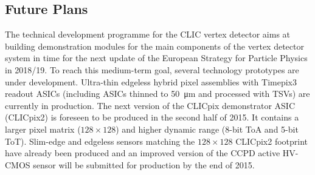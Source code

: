 \subsection{Future Plans}
The technical development programme for the CLIC vertex detector aims at building
demonstration modules for the main components of the vertex detector system
in time for the next update of the European Strategy
for Particle Physics in 2018/19. To reach this medium-term goal, several technology prototypes
are under development.
Ultra-thin edgeless hybrid pixel assemblies with Timepix3 readout ASICs (including ASICs thinned to \SI{50}{\micro\meter}
and processed with TSVs) are currently in production.
The next version of the CLICpix demonstrator
ASIC (CLICpix2) is foreseen to be produced in the second half of 2015. It contains a larger
pixel matrix ($128\times 128$) and higher dynamic range (8-bit ToA and 5-bit ToT).
Slim-edge and edgeless sensors matching the $128\times 128$ CLICpix2 footprint have already been produced and an
improved version of the CCPD active HV-CMOS sensor will be submitted for production by the end of 2015.

